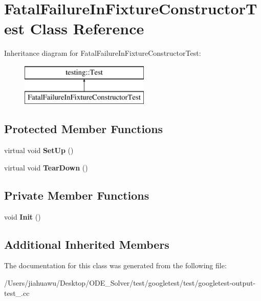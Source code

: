 \hypertarget{class_fatal_failure_in_fixture_constructor_test}{}\section{Fatal\+Failure\+In\+Fixture\+Constructor\+Test Class Reference}
\label{class_fatal_failure_in_fixture_constructor_test}
Inheritance diagram for Fatal\+Failure\+In\+Fixture\+Constructor\+Test\+:\begin{figure}[H]
\begin{center}
\leavevmode
\includegraphics[height=2.000000cm]{class_fatal_failure_in_fixture_constructor_test}
\end{center}
\end{figure}
\subsection*{Protected Member Functions}
\begin{DoxyCompactItemize}
\item 
\mbox{\label{class_fatal_failure_in_fixture_constructor_test_a006d3ac0e7a4ad3c469c3b41dc7c42c3}} 
virtual void {\bfseries Set\+Up} ()
\item 
\mbox{\label{class_fatal_failure_in_fixture_constructor_test_a2763026a557e1fce4e59bd16c4eced57}} 
virtual void {\bfseries Tear\+Down} ()
\end{DoxyCompactItemize}
\subsection*{Private Member Functions}
\begin{DoxyCompactItemize}
\item 
\mbox{\label{class_fatal_failure_in_fixture_constructor_test_a964f36872650e663673ec0ff67e43acf}} 
void {\bfseries Init} ()
\end{DoxyCompactItemize}
\subsection*{Additional Inherited Members}


The documentation for this class was generated from the following file\+:\begin{DoxyCompactItemize}
\item 
/\+Users/jiahuawu/\+Desktop/\+O\+D\+E\+\_\+\+Solver/test/googletest/test/googletest-\/output-\/test\+\_\+.\+cc\end{DoxyCompactItemize}
